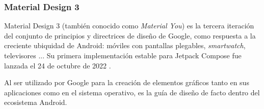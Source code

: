         \subsubsection{Material Design 3}
            Material Design 3 (también conocido como \textit{Material You}) es la tercera iteración del 
            conjunto de principios y directrices de diseño de Google, 
            como respuesta a la creciente ubiquidad de Android: móviles con pantallas
            plegables, \textit{smartwatch}, televisores \cite{ramirez_que_2022}... 
            Su primera implementación estable para Jetpack Compose fue lanzada el 
            24 de octubre de 2022 \cite{singh_material_2022}. 
            
            Al ser utilizado por Google para la creación de elementos 
            gráficos tanto en sus aplicaciones como en el sistema operativo, es la guía de diseño de facto dentro del
            ecosistema Android. 

